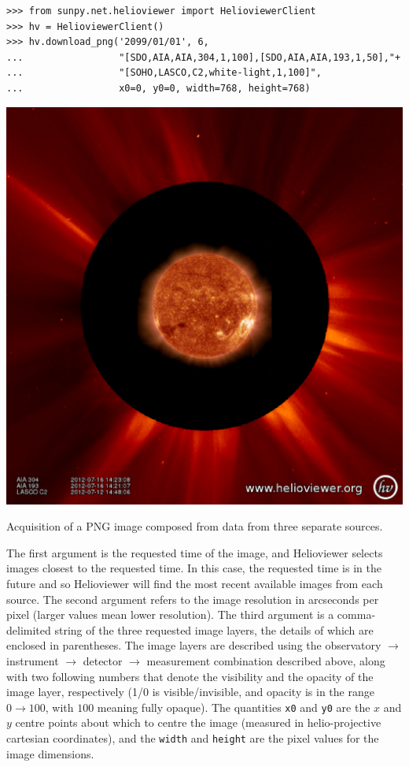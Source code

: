 \begin{listing}[H]
\begin{verbatim}
>>> from sunpy.net.helioviewer import HelioviewerClient
>>> hv = HelioviewerClient()
>>> hv.download_png('2099/01/01', 6,
...                 "[SDO,AIA,AIA,304,1,100],[SDO,AIA,AIA,193,1,50],"+
...                 "[SOHO,LASCO,C2,white-light,1,100]",
...                 x0=0, y0=0, width=768, height=768)
\end{verbatim}
\begin{center}
\includegraphics[width=0.6\columnwidth]{helioviewer_overlay_example}
\end{center}
\caption{Acquisition of a PNG image composed from data from three
  separate sources.}
\label{code:hv:overlaid}
\end{listing}

The first argument is the requested time of the image, and Helioviewer
selects images closest to the requested time.  In this case, the
requested time is in the future and so Helioviewer will find the most
recent available images from each source.  The second argument refers
to the image resolution in arcseconds per pixel (larger values mean
lower resolution).  The third argument is a comma-delimited string of
the three requested image layers, the details of which are enclosed
in parentheses. The image layers are described using the observatory
$\rightarrow$ instrument $\rightarrow$ detector $\rightarrow$
measurement combination described above, along with two following
numbers that denote the visibility and the opacity of the image layer,
respectively (1/0 is visible/invisible, and opacity is in the range
$0\rightarrow100$, with $100$ meaning fully opaque).  The quantities
\texttt{x0} and \texttt{y0} are the $x$ and $y$ centre points about
which to centre the image (measured in helio-projective cartesian
coordinates), and the \texttt{width} and \texttt{height} are the pixel
values for the image dimensions.

